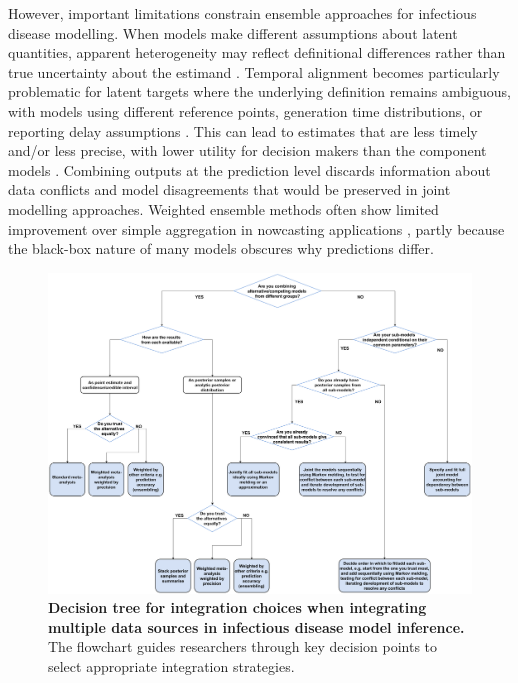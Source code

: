 \documentclass{article}
\begin{document}
However, important limitations constrain ensemble approaches for infectious disease modelling.
When models make different assumptions about latent quantities, apparent heterogeneity may reflect definitional differences rather than true uncertainty about the estimand \citep{brockhaus2023why}.
Temporal alignment becomes particularly problematic for latent targets where the underlying definition remains ambiguous, with models using different reference points, generation time distributions, or reporting delay assumptions \citep{brockhaus2023why}.
This can lead to estimates that are less timely and/or less precise, with lower utility for decision makers than the component models \citep{manley2024combining}.
Combining outputs at the prediction level discards information about data conflicts and model disagreements that would be preserved in joint modelling approaches.
Weighted ensemble methods often show limited improvement over simple aggregation in nowcasting applications \citep{sherratt2021exploring}, partly because the black-box nature of many models obscures why predictions differ.

\begin{figure}[htbp]
    \centering
    \includegraphics[width=\textwidth]{figures/integration choices decision tree.drawio.pdf}
    \caption{\textbf{Decision tree for integration choices when integrating multiple data sources in infectious disease model inference.} The flowchart guides researchers through key decision points to select appropriate integration strategies.}
    \label{fig:integration}
\end{figure}
\end{document}
